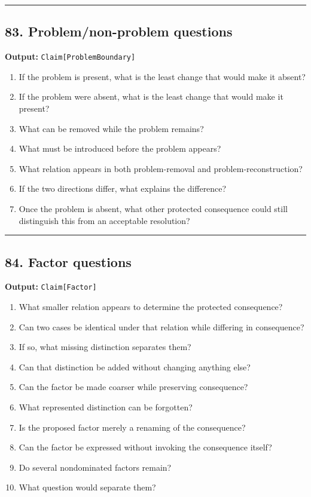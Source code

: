 \documentclass[
]{article}
\providecommand{\tightlist}{%
  \setlength{\itemsep}{0pt}\setlength{\parskip}{0pt}}
\begin{document}
\begin{center}\rule{0.5\linewidth}{0.5pt}\end{center}

\subsection{83. Problem/non-problem
questions}\label{problemnon-problem-questions}

\textbf{Output:} \texttt{Claim{[}ProblemBoundary{]}}

\begin{enumerate}
\def\labelenumi{\arabic{enumi}.}
\tightlist
\item
  If the problem is present, what is the least change that would make it
  absent?
\item
  If the problem were absent, what is the least change that would make
  it present?
\item
  What can be removed while the problem remains?
\item
  What must be introduced before the problem appears?
\item
  What relation appears in both problem-removal and
  problem-reconstruction?
\item
  If the two directions differ, what explains the difference?
\item
  Once the problem is absent, what other protected consequence could
  still distinguish this from an acceptable resolution?
\end{enumerate}

\begin{center}\rule{0.5\linewidth}{0.5pt}\end{center}

\subsection{84. Factor questions}\label{factor-questions}

\textbf{Output:} \texttt{Claim{[}Factor{]}}

\begin{enumerate}
\def\labelenumi{\arabic{enumi}.}
\tightlist
\item
  What smaller relation appears to determine the protected consequence?
\item
  Can two cases be identical under that relation while differing in
  consequence?
\item
  If so, what missing distinction separates them?
\item
  Can that distinction be added without changing anything else?
\item
  Can the factor be made coarser while preserving consequence?
\item
  What represented distinction can be forgotten?
\item
  Is the proposed factor merely a renaming of the consequence?
\item
  Can the factor be expressed without invoking the consequence itself?
\item
  Do several nondominated factors remain?
\item
  What question would separate them?
\end{enumerate}
\end{document}
